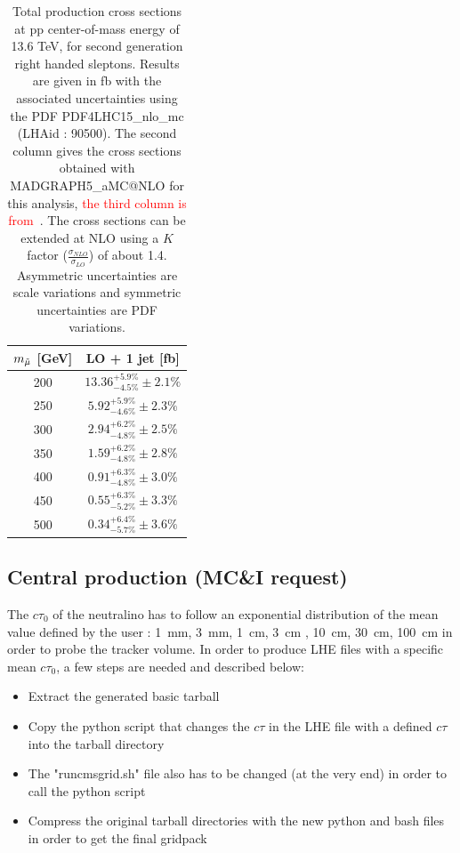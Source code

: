 \documentclass{cernatlasnote}
\begin{document}
\begin{appendices}
\begin{table}
    \centering
    \caption{Total production cross sections at pp center-of-mass  energy of 13.6 TeV, for second generation right handed sleptons. Results are given in fb with the associated uncertainties using the PDF PDF4LHC15\_nlo\_mc (LHAid : 90500). The second column gives the cross sections obtained with MADGRAPH5\_aMC@NLO for this analysis, \textcolor{red}{the third column is from~\cite{Fuks_2014}}. The cross sections can be extended at NLO using a $K$ factor ($\frac{\sigma_{NLO}}{\sigma_{LO}}$) of about 1.4. Asymmetric uncertainties are scale variations and symmetric uncertainties are PDF variations.} 
    \label{tab:RIGHTXS13p6}
    \smallskip
    \begin{tabular}{ cc }
         $m_{\Tilde{\mu}}$ [GeV]  & LO + 1 jet [fb]  \\
         \hline
         200  & $13.36^{+5.9\%}_{-4.5\%} \pm 2.1\% $  \\
         250  & $5.92^{+5.9\%}_{-4.6\%} \pm 2.3\%$    \\
         300  & $2.94^{+6.2\%}_{-4.8\%} \pm 2.5\%$  \\
         350  & $1.59^{+6.2\%}_{-4.8\%} \pm 2.8\% $   \\
         400  & $0.91^{+6.3\%}_{-4.8\%} \pm 3.0\%$  \\
         450  & $0.55^{+6.3\%}_{-5.2\%} \pm 3.3\%$   \\
         500  & $0.34^{+6.4\%}_{-5.7\%} \pm 3.6\%$  \\
    \end{tabular}
\end{table}

\subsection{Central production (MC\&I request)}
    The $c\tau_0$ of the neutralino has to follow an exponential distribution of the mean value defined by the user : 1~mm, 3~mm, 1~cm, 3~cm , 10~cm, 30~cm, 100~cm in order to probe the tracker volume. In order to produce LHE files with a specific mean $c\tau_0$, a few steps are needed and described below:
        \begin{itemize}
            \item Extract the generated basic tarball 
            \item Copy the python script that changes the $c\tau$ in the LHE file with a defined $c\tau$ into the tarball directory
            \item The "runcmsgrid.sh" file also has to be changed (at the very end) in order to call the python script
            \item Compress the original tarball directories with the new python and bash files in order to get the final gridpack
        \end{itemize}
\newpage


\end{appendices}
\end{document}
